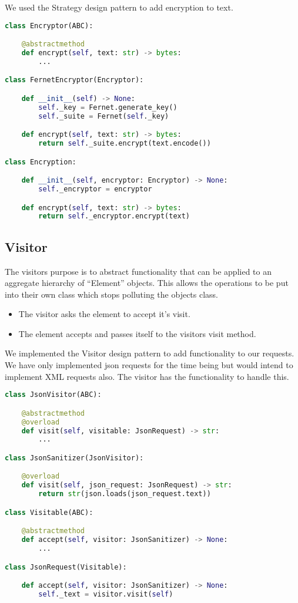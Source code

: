 We used the Strategy design pattern to add encryption to text.


\begin{lstlisting}[language=Python]
class Encryptor(ABC):

	@abstractmethod
	def encrypt(self, text: str) -> bytes:
		...

class FernetEncryptor(Encryptor):

	def __init__(self) -> None:
		self._key = Fernet.generate_key()
		self._suite = Fernet(self._key)

	def encrypt(self, text: str) -> bytes:
		return self._suite.encrypt(text.encode())

class Encryption:

	def __init__(self, encryptor: Encryptor) -> None:
		self._encryptor = encryptor

	def encrypt(self, text: str) -> bytes:
		return self._encryptor.encrypt(text)
\end{lstlisting}

\subsection{Visitor}
The visitors purpose is to abstract functionality that can be applied to an aggregate hierarchy of ``Element'' objects. \cite{sourcemaking} This allows the operations to be put into their own class which stops polluting the objects class.
\begin{itemize}
	\item The visitor asks the element to accept it's visit.
	\item The element accepts and passes itself to the visitors visit method.
\end{itemize}

We implemented the Visitor design pattern to add functionality to our requests. We have only implemented json
requests for the time being but would intend to implement XML requests also. The visitor has the functionality
to handle this.

\begin{lstlisting}[language=Python]
class JsonVisitor(ABC):

	@abstractmethod
	@overload
	def visit(self, visitable: JsonRequest) -> str:
		...

class JsonSanitizer(JsonVisitor):

	@overload
	def visit(self, json_request: JsonRequest) -> str:
		return str(json.loads(json_request.text))

class Visitable(ABC):

	@abstractmethod
	def accept(self, visitor: JsonSanitizer) -> None:
		...

class JsonRequest(Visitable):

	def accept(self, visitor: JsonSanitizer) -> None:
		self._text = visitor.visit(self)

\end{lstlisting}

